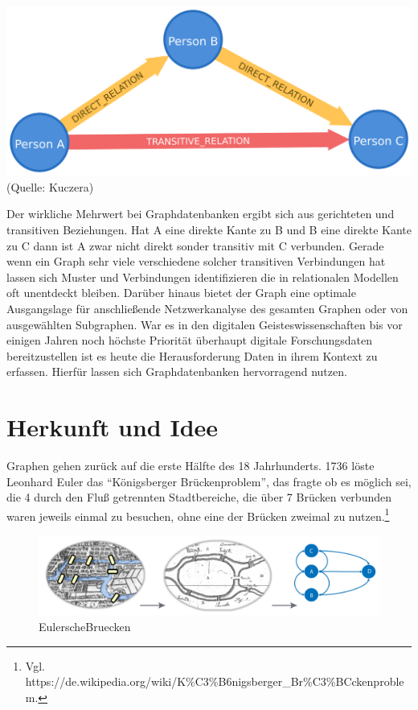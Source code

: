 \documentclass[ngerman,]{scrreprt}
\begin{document}
\includegraphics{Bilder/directTransitive.png} (Quelle: Kuczera)

Der wirkliche Mehrwert bei Graphdatenbanken ergibt sich aus gerichteten und transitiven Beziehungen. Hat A eine direkte Kante zu B und B eine direkte Kante zu C dann ist A zwar nicht direkt sonder transitiv mit C verbunden. Gerade wenn ein Graph sehr viele verschiedene solcher transitiven Verbindungen hat lassen sich Muster und Verbindungen identifizieren die in relationalen Modellen oft unentdeckt bleiben. Darüber hinaus bietet der Graph eine optimale Ausgangslage für anschließende Netzwerkanalyse des gesamten Graphen oder von ausgewählten Subgraphen. War es in den digitalen Geisteswissenschaften bis vor einigen Jahren noch höchste Priorität überhaupt digitale Forschungsdaten bereitzustellen ist es heute die Herausforderung Daten in ihrem Kontext zu erfassen. Hierfür lassen sich Graphdatenbanken hervorragend nutzen.

\section{Herkunft und Idee}\label{herkunft-und-idee}

Graphen gehen zurück auf die erste Hälfte des 18 Jahrhunderts. 1736 löste Leonhard Euler das ``Königsberger Brückenproblem'', das fragte ob es möglich sei, die 4 durch den Fluß getrennten Stadtbereiche, die über 7 Brücken verbunden waren jeweils einmal zu besuchen, ohne eine der Brücken zweimal zu nutzen.\footnote{Vgl. https://de.wikipedia.org/wiki/K\%C3\%B6nigsberger\_Br\%C3\%BCckenproblem.}

\begin{figure}
\centering
\includegraphics{Bilder/Eulersche-Bruecken.png}
\caption{EulerscheBruecken}
\end{figure}
\end{document}
